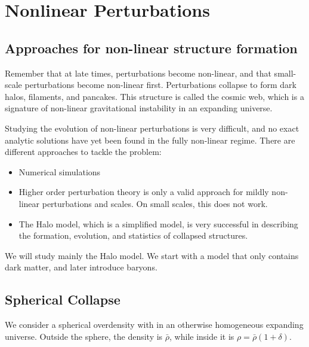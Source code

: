 \chapter{Nonlinear Perturbations}

\section{Approaches for non-linear structure formation}

Remember that at late times, perturbations become non-linear, and that small-scale perturbations become non-linear first.
Perturbations collapse to form dark halos, filaments, and pancakes.
This structure is called the cosmic web, which is a signature of non-linear gravitational instability in an expanding universe.

Studying the evolution of non-linear perturbations is very difficult, and no exact analytic solutions have yet been found in the fully non-linear regime.
There are different approaches to tackle the problem:
\begin{itemize}
	\item Numerical simulations
	\item Higher order perturbation theory is only a valid approach for mildly non-linear perturbations and scales.
	On small scales, this does not work.
	\item The Halo model, which is a simplified model, is very successful in describing the formation, evolution, and statistics of collapsed structures.
\end{itemize}

We will study mainly the Halo model. We start with a model that only contains dark matter, and later introduce baryons.

\section{Spherical Collapse}

We consider a spherical overdensity with in an otherwise homogeneous expanding universe. Outside the sphere, the density is $\bar{\rho}$, while inside it is $\rho = \bar{\rho}(1+\delta)$.

